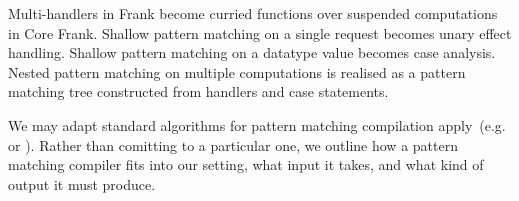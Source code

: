 \documentclass[preprint]{sigplanconf}
\newcommand{\many}{\overline}
\newcommand{\judgeword}[1]{~\mathbf{#1}~}
\newcommand{\sigentails}[1]{\mathbin{[{\text{\scriptsize ${#1}$}}]\!\text{-\!-}}\,}
\newcommand{\rt}[1]{\langle{#1}\rangle}   %
\newcommand{\makes}[4]  {#1 \sigentails{#2} {#3} \judgeword{is} {#4}}
\newcommand{\has}[4] {#1 \sigentails{#2} {#3} \judgeword{has} {#4}}
\newcommand{\can}[4]{#1 \sigentails{#2} {#3} \judgeword{is} {#4}}
\newcommand{\makesgs}{\makes{\Gamma}{\sigs}}
\newcommand{\hasgs}{\has{\Gamma}{\sigs}}
\newcommand{\sigs}{\Sigma}
\newcommand{\effbox}[1]{[#1]}
\newcommand{\key}[1]{\mathsf{#1}}
\newcommand{\handleSymbol}{\mathbin{?}}
\newcommand{\handle}[2]{{#1} \handleSymbol {#2}}
\newcommand{\thunk}[1]{\{{#1}\}}
\begin{document}






Multi-handlers in Frank become curried functions over suspended
computations in Core Frank.
%
Shallow pattern matching on a single request becomes unary effect
handling. Shallow pattern matching on a datatype value becomes case
analysis. Nested pattern matching on multiple computations is realised
as a pattern matching tree constructed from handlers and case
statements. 

We may adapt standard algorithms for pattern matching compilation
apply~(e.g. \cite{Augustsson85} or \cite{Maranget08}). Rather than
comitting to a particular one, we outline how a pattern matching
compiler fits into our setting, what input it takes, and what kind of
output it must produce.
\end{document}
